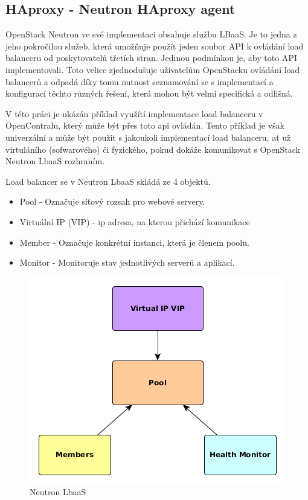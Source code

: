 \subsection{HAproxy - Neutron HAproxy agent}

OpenStack Neutron ve své implementaci obsahuje službu LBaaS. Je to jedna z jeho pokročilou služeb, která umožňuje použít jeden soubor API k ovládání load balanceru od poskytovatelů třetích stran. Jedinou podmínkou je, aby toto API implementovali. Toto velice zjednodušuje uživatelům OpenStacku ovládání load balancerů a odpadá díky tomu nutnost seznamování se s implementací a konfigurací těchto různých řešení, která mohou být velmi specifická a odlišná.

V této práci je ukázán příklad využítí implementace load balanceru v OpenContralu, který může být přes toto api ovládán. Tento příklad je však univerzální a může být použit s jakoukoli implementací load balanceru, at už virtuláního (sofwarového) či fyzického, pokud dokáže komunikovat s OpenStack Neutron LbaaS rozhraním. 

Load balancer se v Neutron LbaaS skládá ze 4 objektů.

\begin{itemize}
\item Pool - Označuje síťový rozsah pro webové servery.
\item Virtuální IP (VIP) - ip adresa, na kterou přichází komunikace
\item Member - Označuje konkrétní instanci, která je členem poolu.
\item Monitor - Monitoruje stav jednotlivých serverů a aplikací.
\end{itemize}

\begin{figure}[h]
\begin{centering}
\includegraphics[scale=0.63]{images/NeutronLbaaS}
\par\end{centering}
\caption{Neutron LbaaS\label{fig:NeutronLbaaS}}
\end{figure}

